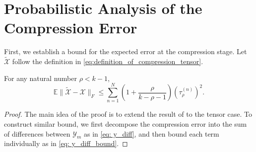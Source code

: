 \section{Probabilistic Analysis of the Compression Error}
First, we establish a bound for the expected error at the compression stage. Let $\tilde{\mathscr{X}}$ follow the definition in \eqref{eq:definition_of_compression_tensor}.
\begin{lem}
\label{lemma: compression_error}
For any natural number $\rho<k-1$,
\begin{equation}
\mathbb{E}  \|\tilde{\mathscr{X}} - \mathscr{X}\|_F \le \sum_{n=1}^N \left(1+\frac{\rho}{k-\rho-1}\right)(\tau^{(n)}_\rho)^2. 
\end{equation}

\begin{proof}
The main idea of the proof is to extend the result of \cite{halko2011finding} to the tensor case. To construct similar bound, we first decompose the compression error into the sum of differences between $\mathscr{Y}_m$ as in \eqref{eq: y_diff}, and then bound each term individually as in \eqref{eq: y_diff_bound}.


\end{proof}
\end{lem}
